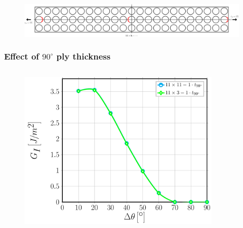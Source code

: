 \documentclass[first,firstsupp,lastsupp,last,hyperref,table]{ETHclass}
\begin{document}
\begin{frame}
\begin{columns}[c]
\begin{column}{0.5\textwidth}
\begin{figure}
\end{figure}
\end{column}
\end{columns}
\begin{figure}
\centering
\includegraphics[width=\textwidth]{twofibers-sameside-crackshielding11.pdf}
\end{figure}
\end{frame}

\addtocounter{framenumber}{-1}

\begin{frame}
\frametitle{\vspace{0.2cm}\small Effect of $90^{\circ}$ ply thickness}
\vspace{-.75cm}
\centering
\begin{columns}[c]
\centering
\begin{column}{0.5\textwidth}
\centering
\begin{figure}
\centering
\includegraphics[width=\columnwidth]{nxk-1-vf60-GI-thin.pdf}
\end{figure}
\end{column}
\begin{column}{0.5\textwidth}
\centering
\begin{figure}
\centering

\end{figure}
\end{column}
\end{columns}
\end{frame}
\end{document}
